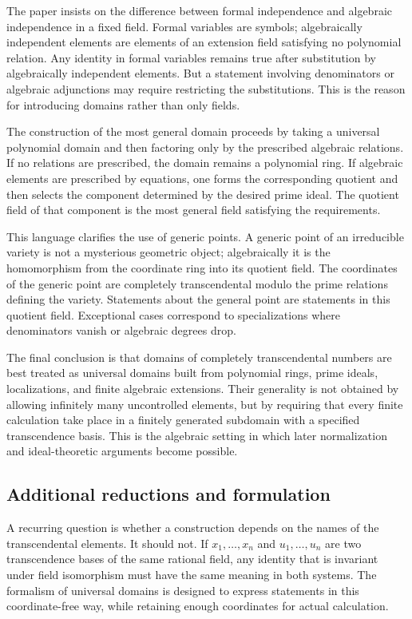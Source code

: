 \documentclass[12pt]{article}
\begin{document}
The paper insists on the difference between formal independence and algebraic independence in a
fixed field. Formal variables are symbols; algebraically independent elements are elements of an
extension field satisfying no polynomial relation. Any identity in formal variables remains true
after substitution by algebraically independent elements. But a statement involving denominators or
algebraic adjunctions may require restricting the substitutions. This is the reason for introducing
domains rather than only fields.


The construction of the most general domain proceeds by taking a universal polynomial domain and
then factoring only by the prescribed algebraic relations. If no relations are prescribed, the
domain remains a polynomial ring. If algebraic elements are prescribed by equations, one forms the
corresponding quotient and then selects the component determined by the desired prime ideal. The
quotient field of that component is the most general field satisfying the requirements.


This language clarifies the use of generic points. A generic point of an irreducible variety is not
a mysterious geometric object; algebraically it is the homomorphism from the coordinate ring into
its quotient field. The coordinates of the generic point are completely transcendental modulo the
prime relations defining the variety. Statements about the general point are statements in this
quotient field. Exceptional cases correspond to specializations where denominators vanish or
algebraic degrees drop.


The final conclusion is that domains of completely transcendental numbers are best treated as
universal domains built from polynomial rings, prime ideals, localizations, and finite algebraic
extensions. Their generality is not obtained by allowing infinitely many uncontrolled elements, but
by requiring that every finite calculation take place in a finitely generated subdomain with a
specified transcendence basis. This is the algebraic setting in which later normalization and
ideal-theoretic arguments become possible.


\subsection{Additional reductions and formulation}

A recurring question is whether a construction depends on the names of the transcendental elements.
It should not. If \(x_1,\ldots,x_n\) and \(u_1,\ldots,u_n\) are two transcendence bases of the same
rational field, any identity that is invariant under field isomorphism must have the same meaning in
both systems. The formalism of universal domains is designed to express statements in this
coordinate-free way, while retaining enough coordinates for actual calculation.
\end{document}
